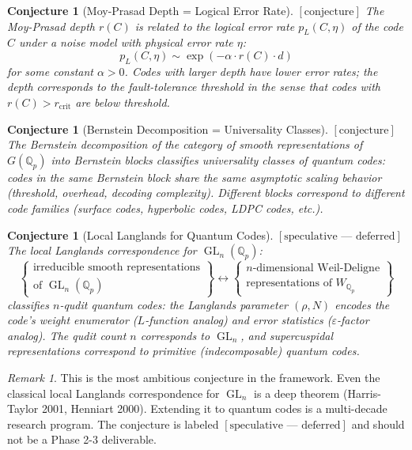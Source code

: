 \documentclass[12pt]{article}
\newtheorem{conjecture}[definition]{Conjecture}
\theoremstyle{remark}
\newtheorem{remark}[definition]{Remark}
\begin{document}
\begin{conjecture}[Moy-Prasad Depth = Logical Error Rate]
$[\text{conjecture}]$
The Moy-Prasad depth $r(C)$ is related to the logical error rate
$p_L(C, \eta)$ of the code $C$ under a noise model with physical error
rate $\eta$:
\[
p_L(C, \eta) \sim \exp(-\alpha \cdot r(C) \cdot d)
\]
for some constant $\alpha > 0$. Codes with larger depth have lower error
rates; the depth corresponds to the fault-tolerance threshold in the sense
that codes with $r(C) > r_{\text{crit}}$ are below threshold.
\end{conjecture}

\begin{conjecture}[Bernstein Decomposition = Universality Classes]
$[\text{conjecture}]$
The Bernstein decomposition of the category of smooth representations of
$G(\mathbb{Q}_p)$ into Bernstein blocks classifies universality classes
of quantum codes: codes in the same Bernstein block share the same
asymptotic scaling behavior (threshold, overhead, decoding complexity).
Different blocks correspond to different code families (surface codes,
hyperbolic codes, LDPC codes, etc.).
\end{conjecture}

\begin{conjecture}[Local Langlands for Quantum Codes]
$[\text{speculative — deferred}]$
The local Langlands correspondence for $\operatorname{GL}_n(\mathbb{Q}_p)$:
\[
\begin{Bmatrix}
\text{irreducible smooth representations} \\
\text{of } \operatorname{GL}_n(\mathbb{Q}_p)
\end{Bmatrix}
\longleftrightarrow
\begin{Bmatrix}
n\text{-dimensional Weil-Deligne} \\
\text{representations of } W_{\mathbb{Q}_p}
\end{Bmatrix}
\]
classifies $n$-qudit quantum codes: the Langlands parameter
$(\rho, N)$ encodes the code's weight enumerator
($L$-function analog) and error statistics
($\varepsilon$-factor analog). The qudit count $n$ corresponds to
$\operatorname{GL}_n$, and supercuspidal representations correspond
to primitive (indecomposable) quantum codes.
\end{conjecture}

\begin{remark}
This is the most ambitious conjecture in the framework. Even the
classical local Langlands correspondence for $\operatorname{GL}_n$
is a deep theorem (Harris-Taylor 2001, Henniart 2000). Extending it
to quantum codes is a multi-decade research program. The conjecture
is labeled $[\text{speculative — deferred}]$ and should not be a
Phase 2-3 deliverable.
\end{remark}
\end{document}
